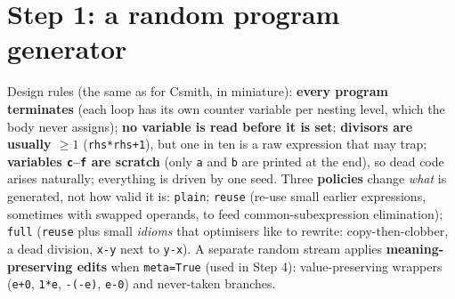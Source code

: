 \documentclass[10pt,a4paper,openany,oneside]{report}
\newcommand{\prio}[1]{\texorpdfstring{\ifcase#1\or{\color{gold}\ding{72}}\or{\color{gold}\ding{72}\ding{72}}\or{\color{gold}\ding{72}\ding{72}\ding{72}}\fi}{}}
\begin{document}
\section{Step 1: a random program generator \prio{3}}
Design rules (the same as for Csmith, in miniature): \textbf{every program terminates} (each loop has its own counter variable per nesting level, which the body never assigns); \textbf{no variable is read before it is set}; \textbf{divisors are usually $\ge1$} (\texttt{rhs*rhs+1}), but one in ten is a raw expression that may trap; \textbf{variables \texttt{c}--\texttt{f} are scratch} (only \texttt{a} and \texttt{b} are printed at the end), so dead code arises naturally; everything is driven by one seed. Three \textbf{policies} change \emph{what} is generated, not how valid it is: \texttt{plain}; \texttt{reuse} (re-use small earlier expressions, sometimes with swapped operands, to feed common-subexpression elimination); \texttt{full} (\texttt{reuse} plus small \emph{idioms} that optimisers like to rewrite: copy-then-clobber, a dead division, \texttt{x-y} next to \texttt{y-x}). A separate random stream applies \textbf{meaning-preserving edits} when \texttt{meta=True} (used in Step 4): value-preserving wrappers (\texttt{e+0}, \texttt{1*e}, \texttt{-(-e)}, \texttt{e-0}) and never-taken branches.
\end{document}
